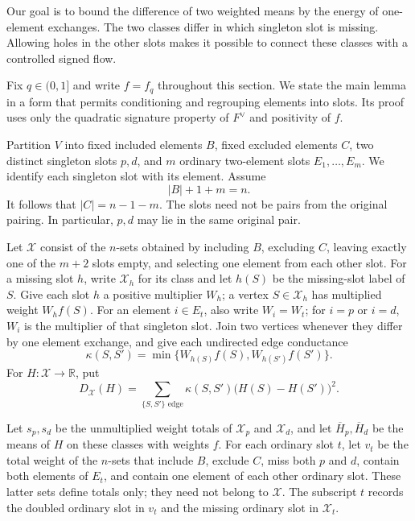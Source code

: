 \documentclass[11pt]{article}
\theoremstyle{definition}
\newcommand{\R}{\mathbb R}
\begin{document}
Our goal is to bound the difference of two weighted means by the energy
of one-element exchanges.  The two classes differ in which singleton
slot is missing.  Allowing holes in the other slots makes it possible
to connect these classes with a controlled signed flow.

Fix $q\in(0,1]$ and write $f=f_q$ throughout this section.  We state the
main lemma in a form that permits conditioning and regrouping elements
into slots.  Its proof uses only the quadratic signature property of
$F^\vee$ and positivity of $f$.

Partition $V$ into fixed included elements $B$, fixed excluded elements
$C$, two distinct singleton slots $p,d$, and $m$ ordinary two-element
slots $E_1,\ldots,E_m$.  We identify each singleton slot with its element.
Assume
\begin{equation}\label{eq:slotsizes}
 |B|+1+m=n.
\end{equation}
It follows that $|C|=n-1-m$.  The slots need not be pairs from the original
pairing.  In particular, $p,d$ may lie in the same original pair.

Let $\mathcal X$ consist of the $n$-sets obtained by including $B$,
excluding $C$, leaving exactly one of the $m+2$ slots empty, and selecting
one element from each other slot.  For a missing slot $h$, write
$\mathcal X_h$ for its class and let $h(S)$ be the missing-slot label of
$S$.  Give each slot $h$ a positive multiplier $W_h$; a vertex
$S\in\mathcal X_h$ has multiplied weight $W_hf(S)$.
For an element $i\in E_t$, also write $W_i=W_t$; for $i=p$ or $i=d$,
$W_i$ is the multiplier of that singleton slot.
Join two vertices whenever they differ by one element exchange, and give
each undirected edge conductance
\[
 \kappa(S,S')=\min\{W_{h(S)}f(S),W_{h(S')}f(S')\}.
\]
For $H:\mathcal X\to\R$, put
\[
 D_{\mathcal X}(H)=\sum_{\{S,S'\}\text{ edge}}
              \kappa(S,S')\bigl(H(S)-H(S')\bigr)^2.
\]

Let $s_p,s_d$ be the unmultiplied weight totals of $\mathcal X_p$ and
$\mathcal X_d$, and let $\overline H_p,\overline H_d$ be the means of $H$
on these classes with weights $f$.  For each ordinary slot $t$, let $v_t$
be the total weight of the $n$-sets that include $B$, exclude $C$, miss
both $p$ and $d$, contain both elements of $E_t$, and contain one element
of each other ordinary slot.  These latter sets define totals only;
they need not belong to $\mathcal X$.  The subscript $t$ records the
doubled ordinary slot in $v_t$ and the missing ordinary slot in
$\mathcal X_t$.
\end{document}
